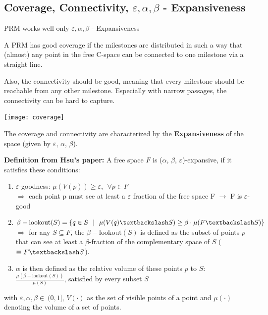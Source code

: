 \begin{multicols*}{2}
\subsection{Coverage, Connectivity, $\varepsilon, \alpha, \beta$ - Expansiveness}
PRM works well only $\varepsilon, \alpha, \beta$ - Expansiveness

A PRM has good coverage if the milestones are distributed in such a way that (almost) any point in the free C-space can be connected to one milestone via a straight line. 

Also, the connectivity should be good, meaning that every milestone should be reachable from any other milestone. Especially with narrow passages, the connectivity can be hard to capture.

\texttt{[image: coverage]}

The coverage and connectivity are characterized by the \textbf{Expansiveness} of the space (given by $\varepsilon$, $\alpha$, $\beta$).

\textbf{Definition from Hsu's paper:} A free space $F$ is ($\alpha$, $\beta$, $\varepsilon$)-expansive, if it satisfies these conditions: 
\begin{enumerate}
	\item $\varepsilon$-goodness: $\mu (V(p))  \geq \varepsilon , ~~ \forall p \in F$ \\
	$\Rightarrow$ each point p must see at least a $\varepsilon$ fraction of the free space F $\rightarrow$ F is $\varepsilon$-good
	\item $\beta-\mathrm{lookout}(S) = \{q\in S ~~|~~ \mu(V(q)\textbackslash S) \geq \beta \cdot \mu(F\textbackslash S)\} $ \\
	$\Rightarrow$ for any $S \subseteq F$, the $\beta-\mathrm{lookout}(S)$ is defined as the subset of points $p$ that can see at least a $\beta$-fraction of the complementary space of $S$ ($\equiv F\textbackslash S$). 
	\item $\alpha$ is then defined as the relative volume of these points $p$ to $S$: $\frac{\mu(\beta-\mathrm{lookout}(S))}{\mu(S)}$, satisfied by every subset $S$
\end{enumerate}

with $\varepsilon, \alpha, \beta \in \ (0,1]$, $V(\cdot)$ as the set of visible points of a point and $\mu(\cdot)$ denoting the volume of a set of points.


\end{multicols*}
